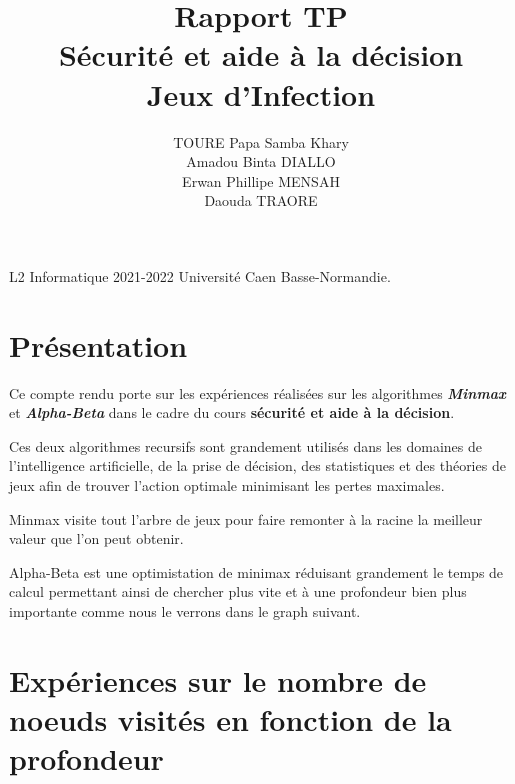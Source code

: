 \documentclass[12pt]{article}
\title{Rapport TP \\Sécurité et aide à la décision \\ \textbf{Jeux d'Infection} }
\author{TOURE Papa Samba Khary \\ Amadou Binta DIALLO \\ Erwan Phillipe MENSAH \\ Daouda TRAORE}
\date{}
\begin{document}
\maketitle

\mbox{}
\vfill
L2 Informatique 2021-2022 Université Caen Basse-Normandie.
\newpage

\section{Présentation}

Ce compte rendu porte sur les expériences réalisées sur les algorithmes 
\textbf{\textit{Minmax}} et \textbf{\textit{Alpha-Beta}} dans le cadre du cours
\textbf{sécurité et aide à la décision}.

Ces deux algorithmes recursifs sont grandement utilisés dans les domaines de l'intelligence
artificielle, de la prise de décision, des statistiques et 
des théories de jeux afin de  trouver l'action optimale minimisant les pertes maximales.

Minmax visite tout l'arbre de jeux pour faire remonter à la racine la meilleur valeur
que l'on peut obtenir.

Alpha-Beta est une optimistation de  minimax réduisant grandement le temps de calcul
permettant ainsi de chercher plus vite et à une profondeur bien plus importante comme nous le 
verrons dans le graph suivant.
\newpage
\section{Expériences sur le nombre de noeuds visités en fonction 
de la profondeur}
\end{document}
